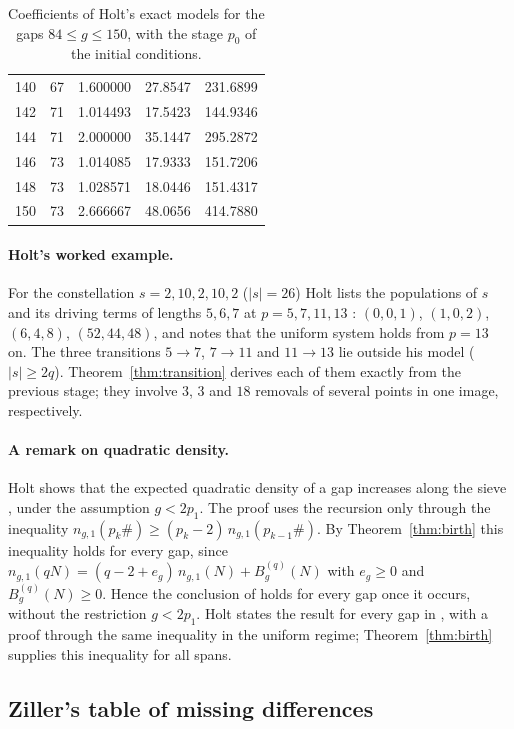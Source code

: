 \documentclass[11pt]{article}
\theoremstyle{definition}
\theoremstyle{remark}
\begin{document}
\begin{table}[ht]
{\begin{tabular}{rrrrr}
140 & 67 & 1.600000 & 27.8547 & 231.6899 \\
142 & 71 & 1.014493 & 17.5423 & 144.9346 \\
144 & 71 & 2.000000 & 35.1447 & 295.2872 \\
146 & 73 & 1.014085 & 17.9333 & 151.7206 \\
148 & 73 & 1.028571 & 18.0446 & 151.4317 \\
150 & 73 & 2.666667 & 48.0656 & 414.7880 \\
\bottomrule
\end{tabular}}
\caption{Coefficients of Holt's exact models for the gaps $84 \le g \le 150$, with the stage $p_0$ of the initial conditions.}\label{tab:holt}
\end{table}

\paragraph{Holt's worked example.} For the constellation $s = 2,10,2,10,2$ ($|s| = 26$) Holt lists the populations of $s$ and its driving terms of lengths $5, 6, 7$ at $p = 5, 7, 11, 13$ \cite[Fig.~6]{Ho26}: $(0,0,1)$, $(1,0,2)$, $(6,4,8)$, $(52,44,48)$, and notes that the uniform system holds from $p = 13$ on. The three transitions $5 \to 7$, $7 \to 11$ and $11 \to 13$ lie outside his model ($|s| \ge 2q$). Theorem~\ref{thm:transition} derives each of them exactly from the previous stage; they involve $3$, $3$ and $18$ removals of several points in one image, respectively.

\paragraph{A remark on quadratic density.} Holt shows that the expected quadratic density of a gap increases along the sieve \cite[Thm.~4.3]{Ho26}, under the assumption $g < 2p_1$. The proof uses the recursion only through the inequality $n_{g,1}(p_k\#) \ge (p_k - 2)\, n_{g,1}(p_{k-1}\#)$. By Theorem~\ref{thm:birth} this inequality holds for every gap, since $n_{g,1}(qN) = (q - 2 + e_g)\, n_{g,1}(N) + B^{(q)}_g(N)$ with $e_g \ge 0$ and $B^{(q)}_g(N) \ge 0$. Hence the conclusion of \cite[Thm.~4.3]{Ho26} holds for every gap once it occurs, without the restriction $g < 2p_1$. Holt states the result for every gap in \cite[Thm.~3.3]{Ho26b}, with a proof through the same inequality in the uniform regime; Theorem~\ref{thm:birth} supplies this inequality for all spans.

\subsection{Ziller's table of missing differences}\label{sec:ziller}
\end{document}
